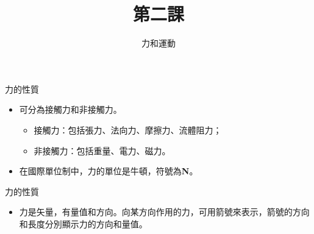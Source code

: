 \documentclass[beamer=true]{standalone}
\title{第二課}
\author{力和運動}
\institute{全年班}
\date{}
\begin{document}
\frame{\titlepage}

\begin{frame}{力的性質}
    \begin{itemize}
        \item 可分為接觸力和非接觸力。
              \begin{itemize}
                  \item 接觸力：包括張力、法向力、摩擦力、流體阻力；
                  \item 非接觸力：包括重量、電力、磁力。
              \end{itemize}
        \item 在國際單位制中，力的單位是牛頓，符號為\textbf{N}。

    \end{itemize}
\end{frame}

\begin{frame}{力的性質}
    \begin{itemize}
        \item 力是矢量，有量值和方向。向某方向作用的力，可用箭號來表示，箭號的方向和長度分別顯示力的方向和量值。
    \end{itemize}
\end{frame}
\end{document}
